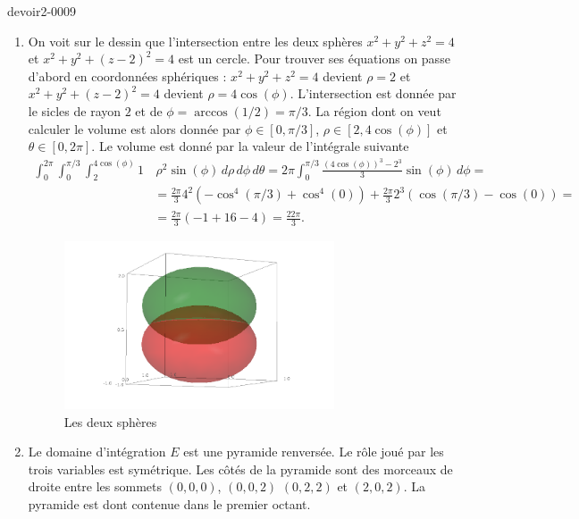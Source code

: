 \begin{corrige}{devoir2-0009}
  \begin{enumerate}
  \item On voit sur le dessin que l'intersection entre les deux sphères $x^2+y^2+z^2=4$ et $x^2+y^2+(z-2)^2=4$ est un cercle. Pour trouver ses équations on passe d'abord en coordonnées sphériques :  $x^2+y^2+z^2=4$ devient $\rho=2$ et $x^2+y^2+(z-2)^2=4$ devient $\rho= 4\cos(\phi)$. L'intersection est donnée par le sicles de rayon $2$ et de $\phi= \arccos(1/2)= \pi/3$. La région dont on veut calculer le volume est alors donnée par $\phi\in[0, \pi/3]$, $\rho\in[2, 4\cos(\phi)] $ et $\theta \in [0, 2\pi]$. Le volume est donné par la valeur de l'intégrale suivante
    \begin{equation}
      \begin{aligned}
        \int_0^{2\pi}\int_0^{\pi/3}\int_2^{4\cos(\phi)}1 & \, \rho^2\sin(\phi)\, d\rho \, d\phi \, d\theta = 2\pi \int_0^{\pi/3}\frac{(4\cos(\phi))^3-2^3}{3} \sin(\phi)\, d\phi= \\
&= \frac{2\pi}{3}4^2\left( -\cos^4(\pi/3)+\cos^4(0)\right)+ \frac{2\pi}{3}2^3 \left( \cos(\pi/3)-\cos(0)\right)=\\
&=\frac{2\pi}{3}(-1+16 - 4) = \frac{22\pi}{3}.
      \end{aligned}
    \end{equation}

    \begin{figure}
      \begin{center}
        \includegraphics[width=8cm]{Fig_exo8devoir2.png}  
        \caption{Les deux sphères}\label{exo8devoir2}
      \end{center}
    \end{figure}
   
  \item Le domaine d'intégration $E$ est une pyramide renversée. Le rôle joué par les trois variables est symétrique. Les côtés de la pyramide sont des morceaux de droite entre les sommets $(0,0,0)$, $(0,0,2)$ $(0, 2, 2)$ et $(2, 0, 2)$. La pyramide est dont contenue dans le premier octant. 
 

\end{enumerate}
\end{corrige}
